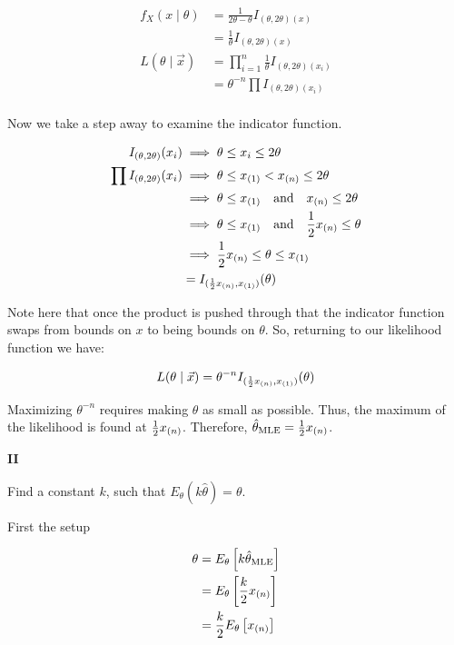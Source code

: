 \begin{align*}
	f_X(x \mid \theta) &= \frac{1}{2\theta - \theta} I_{(\theta, 2\theta)(x)} \\
	&= \frac{1}{\theta}  I_{(\theta, 2\theta)(x)}  \\
	L(\theta \mid \vec{x}) &= \prod_{i=1}^n \frac{1}{\theta}  I_{(\theta, 2\theta)(x_i)}  \\
	&= \theta^{-n} \prod I_{(\theta, 2\theta)(x_i)}  \\
\end{align*}

Now we take a step away to examine the indicator function. 

\begin{align*}
    I_{(\theta, 2\theta)}(x_i) &\implies \theta \leq x_i \leq 2\theta \\
    \prod I_{(\theta, 2\theta)}(x_i) &\implies \theta \leq x_{(1)} < x_{(n)} \leq 2\theta \\
    &\implies \theta \leq x_{(1)} \quad \text{and} \quad x_{(n)} \leq 2\theta \\
    &\implies \theta \leq x_{(1)} \quad \text{and} \quad \frac{1}{2} x_{(n)} \leq \theta \\
    &\implies \frac{1}{2} x_{(n)} \leq \theta \leq x_{(1)} \\
    &= I_{(\frac{1}{2} x_{(n)}, x_{(1)})}(\theta)
\end{align*}

Note here that once the product is pushed through that the indicator function swaps from bounds on $x$ to being bounds on $\theta$. So, returning to our likelihood function we have:

\[
	L(\theta \mid \vec{x}) = \theta^{-n} I_{(\frac{1}{2} x_{(n)}, x_{(1)})}(\theta)
\]

Maximizing $\theta^{-n}$ requires making $\theta$ as small as possible. Thus, the maximum of the likelihood is found at $\frac{1}{2}x_{(n)}$. Therefore, $\hat{\theta}_{\text{MLE}} = \frac{1}{2}x_{(n)}$.

\noindent \textbf{II}

Find a constant $k$, such that $E_{\theta}(k\hat{\theta}) = \theta$.

First the setup

\begin{align*}
	\theta &= E_{\theta}\left[ k \hat{\theta}_{\text{MLE}} \right] \\
	&= E_{\theta}\left[ \frac{k}{2} x_{(n)} \right] \\
	&= \frac{k}{2} E_{\theta}\left[ x_{(n)} \right]
\end{align*}

